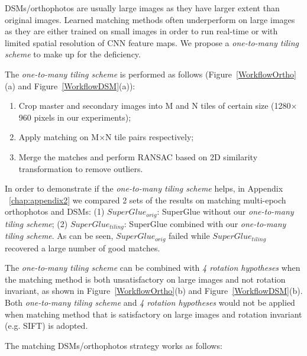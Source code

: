 DSMs/orthophotos are usually large images as they have larger extent than original images.
Learned matching methods often underperform on large images as they are either trained on small images in order to run real-time or with limited spatial resolution of CNN feature maps. We propose a \textit{one-to-many tiling scheme} to make up for the deficiency. 
\par
The \textit{one-to-many tiling scheme} is performed as follows (Figure~\ref{WorkflowOrtho}(a) and Figure~\ref{WorkflowDSM}(a)):\\
\begin{enumerate}
    \item Crop master and secondary images into M and N tiles of certain size (1280$\times$960 pixels in our experiments);
    \item Apply matching on M$\times$N tile pairs respectively;
    \item Merge the matches and perform RANSAC based on 2D similarity transformation to remove outliers.
\end{enumerate}                                   
In order to demonstrate if the \textit{one-to-many tiling scheme} helps, in Appendix ~\ref{chap:appendix2} we compared 2 sets of the results on matching multi-epoch orthophotos and DSMs: (1) $SuperGlue_{orig}$: SuperGlue without our \textit{one-to-many tiling scheme}; (2) $SuperGlue_{tiling}$: SuperGlue combined with our \textit{one-to-many tiling scheme}. As can be seen, $SuperGlue_{orig}$ failed while $SuperGlue_{tiling}$ recovered a large number of good matches.
\par
The \textit{one-to-many tiling scheme} can be combined with \textit{4 rotation hypotheses} when the matching method is both unsatisfactory on large images and not rotation invariant, as shown in Figure~\ref{WorkflowOrtho}(b) and Figure~\ref{WorkflowDSM}(b).
Both \textit{one-to-many tiling scheme} and \textit{4 rotation hypotheses} would not be applied when matching method that is satisfactory on large images and rotation invariant (e.g. SIFT) is adopted.
\par
The matching DSMs/orthophotos strategy works as follows:\\
